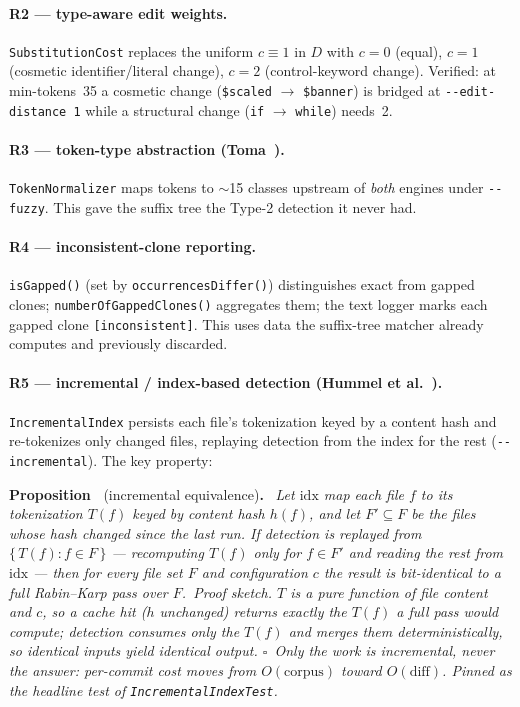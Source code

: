 \documentclass[10pt,a4paper]{article}
\newcounter{prop}[section]
\newcommand{\prop}[1]{\par\medskip\refstepcounter{prop}%
  \noindent\textbf{Proposition~\theprop} (#1)\textbf{.}\ \itshape}
\begin{document}
\paragraph{R2 --- type-aware edit weights.} \lstinline!SubstitutionCost! replaces the uniform
$c\equiv 1$ in $D$ with $c=0$ (equal), $c=1$ (cosmetic identifier/literal change), $c=2$
(control-keyword change). Verified: at min-tokens~35 a cosmetic change (\lstinline!$scaled!
$\rightarrow$ \lstinline!$banner!) is bridged at \texttt{-{}-edit-distance 1} while a structural
change (\lstinline!if! $\rightarrow$ \lstinline!while!) needs~2.

\paragraph{R3 --- token-type abstraction (Toma~\cite{toma}).} \lstinline!TokenNormalizer! maps tokens
to $\sim$15 classes upstream of \emph{both} engines under \texttt{-{}-fuzzy}. This gave the suffix
tree the Type-2 detection it never had.

\paragraph{R4 --- inconsistent-clone reporting.} \lstinline!isGapped()! (set by
\lstinline!occurrencesDiffer()!) distinguishes exact from gapped clones; \lstinline!numberOfGappedClones()!
aggregates them; the text logger marks each gapped clone \texttt{[inconsistent]}. This uses data the
suffix-tree matcher already computes and previously discarded.

\paragraph{R5 --- incremental / index-based detection (Hummel et al.~\cite{hummel}).}
\lstinline!IncrementalIndex! persists each file's tokenization keyed by a content hash and
re-tokenizes only changed files, replaying detection from the index for the rest
(\texttt{-{}-incremental}). The key property:

\prop{incremental equivalence}
Let $\mathrm{idx}$ map each file $f$ to its tokenization $T(f)$ keyed by content hash $h(f)$, and let
$F'\subseteq F$ be the files whose hash changed since the last run. If detection is replayed from
$\{\,T(f): f\in F\,\}$ --- recomputing $T(f)$ only for $f\in F'$ and reading the rest from
$\mathrm{idx}$ --- then for every file set $F$ and configuration $c$ the result is bit-identical to a
full Rabin--Karp pass over $F$.\upshape\
\emph{Proof sketch.} $T$ is a pure function of file content and $c$, so a cache hit ($h$ unchanged)
returns exactly the $T(f)$ a full pass would compute; detection consumes only the $T(f)$ and merges
them deterministically, so identical inputs yield identical output. $\square$\ Only the \emph{work} is
incremental, never the \emph{answer}: per-commit cost moves from $O(\text{corpus})$ toward
$O(\text{diff})$. Pinned as the headline test of \lstinline!IncrementalIndexTest!.
\end{document}
